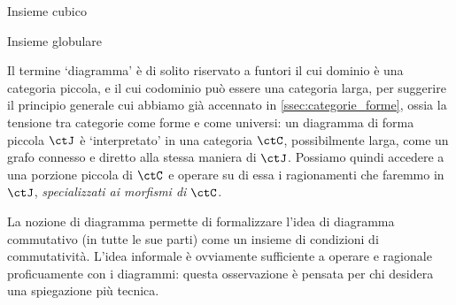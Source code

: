 \begin{definition}\label{def_insieme_cubico}
	Insieme cubico
\end{definition}

\begin{definition}\label{def_insieme_globulare}
	Insieme globulare
\end{definition}

\begin{remark}
	Il termine `diagramma' è di solito riservato a funtori il cui dominio è una categoria piccola, e il cui codominio può essere una categoria larga, per suggerire il principio generale cui abbiamo già accennato in \ref{ssec:categorie_forme}, ossia la tensione tra categorie come forme e come universi: un diagramma di forma piccola \(\ctJ\) è `interpretato' in una categoria \(\ctC\), possibilmente larga, come un grafo connesso e diretto alla stessa maniera di \(\ctJ\). Possiamo quindi accedere a una porzione piccola di \(\ctC\) e operare su di essa i ragionamenti che faremmo in \(\ctJ\), \emph{specializzati ai morfismi di \(\ctC\)}.
\end{remark}
La nozione di diagramma permette di formalizzare l'idea di diagramma commutativo (in tutte le sue parti) come un insieme di condizioni di commutatività. L'idea informale è ovviamente sufficiente a operare e ragionale proficuamente con i diagrammi: questa osservazione è pensata per chi desidera una spiegazione più tecnica.
